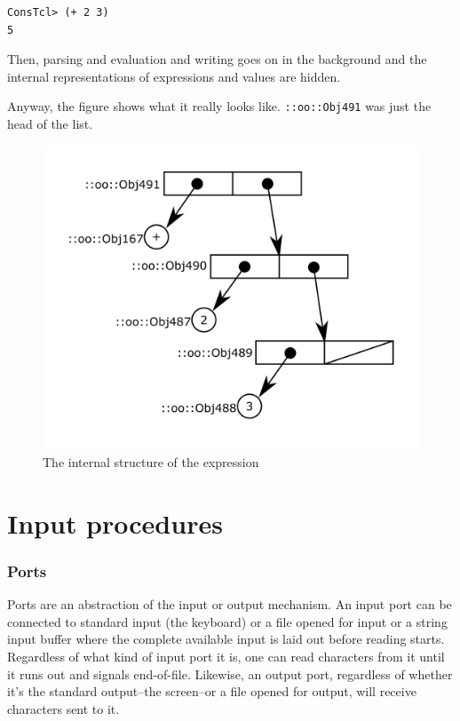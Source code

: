 \documentclass[twoside]{report}
\begin{document}
\begin{verbatim}
ConsTcl> (+ 2 3)
5
\end{verbatim}

Then, parsing and evaluation and writing goes on in the background and the internal representations of expressions and values are hidden.

Anyway, the figure shows what it really looks like. \texttt{::oo::Obj491} was just the head of the list.

\begin{figure}[h!]\includegraphics{images/intreplist.png}\captionsetup{labelformat=empty}\caption{The internal structure of the expression}\label{fig:the-internal-structure-of-the-expression}\end{figure}

\section{Input procedures}
\label{input-procedures}

\begin{pulledtext}

\subsubsection{Ports}
\label{ports}

Ports are an abstraction of the input or output mechanism. An input port can be connected to standard input (the keyboard) or a file opened for input or a string input buffer where the complete available input is laid out before reading starts. Regardless of what kind of input port it is, one can read characters from it until it runs out and signals end-of-file. Likewise, an output port, regardless of whether it's the standard output--the screen--or a file opened for output, will receive characters sent to it.
\end{pulledtext}
\end{document}
